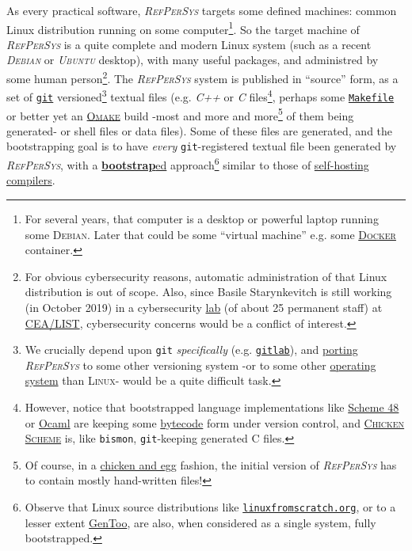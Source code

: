 \documentclass[11pt,a4paper,svgnames]{article}
\newcommand{\RefPerSys}{{\textit{\textsc{RefPerSys}}}}
\begin{document}
As every practical software, {\RefPerSys} targets some defined
machines: common Linux distribution running on some
computer\footnote{For several years, that computer is a desktop or
powerful laptop running some \textsc{Debian}. Later that could be some
``virtual machine'' e.g. some
\href{https://www.docker.com/}{\textsc{Docker}} container.}. So the
target machine of {\RefPerSys} is a quite complete and modern Linux
system (such as a recent \textit{\textsc{Debian}} or
\textit{\textsc{Ubuntu}} desktop), with many useful packages, and
administred by some human person\footnote{For obvious cybersecurity
reasons, automatic administration of that Linux distribution is out of
scope. Also, since Basile Starynkevitch is still working (in October
2019) in a cybersecurity
\href{http://www-list.cea.fr/en/technological-research/research-programmes/embedded-systems/validation-and-verification}{lab}
(of about 25 permanent staff) at
\href{http://www-list.cea.fr/}{CEA/LIST}, cybersecurity concerns would
be a conflict of interest.}. The {\RefPerSys} system is published in
``source'' form, as a set of \href{http://git-scm.com/}{\texttt{git}}
versioned\footnote{We crucially depend upon \texttt{git}
\emph{specifically} (e.g. \href{http://gitlab.org/}{\texttt{gitlab}}),
and \href{https://en.wikipedia.org/wiki/Porting}{porting} {\RefPerSys}
to some other versioning system -or to some other
\href{http://pages.cs.wisc.edu/~remzi/OSTEP/}{operating system} than
\textsc{Linux}- would be a quite difficult task.} textual files
(e.g. \textit{C++} or \textit{C} files\footnote{However, notice that
bootstrapped language implementations like
\href{http://s48.org/}{Scheme 48} or \href{https://ocaml.org/}{Ocaml}
are keeping some
\href{https://en.wikipedia.org/wiki/Bytecode}{bytecode} form under
version control, and \href{https://www.call-cc.org/}{\textsc{Chicken
    Scheme}} is, like \texttt{bismon}, \texttt{git}-keeping generated
C files.}, perhaps some
\href{https://en.wikipedia.org/wiki/Makefile}{\texttt{Makefile}} or
better yet an
\href{http://projects.camlcity.org/projects/omake.html}{\textsc{Omake}}
build -most and more and more\footnote{Of course, in a
\href{https://en.wikipedia.org/wiki/Chicken_or_the_egg}{chicken and
  egg} fashion, the initial version of {\RefPerSys} has to contain
mostly hand-written files!} of them being generated- or shell files or
data files). Some of these files are generated, and the bootstrapping
goal is to have \emph{every} \texttt{git}-registered textual file been
generated by {\RefPerSys}, with a
\href{https://en.wikipedia.org/wiki/Bootstrapping\_(compilers)}{\textbf{bootstrap}ed}
approach\footnote{Observe that Linux source distributions like \href{http://www.linuxfromscratch.org/}{\texttt{linuxfromscratch.org}}, or to a lesser extent \href{https://www.gentoo.org/}{GenToo}, are also, when considered as a single system, fully bootstrapped.} similar to those of
\href{https://en.wikipedia.org/wiki/Self-hosting_(compilers)}{self-hosting
  compilers}.
\medskip
\end{document}
